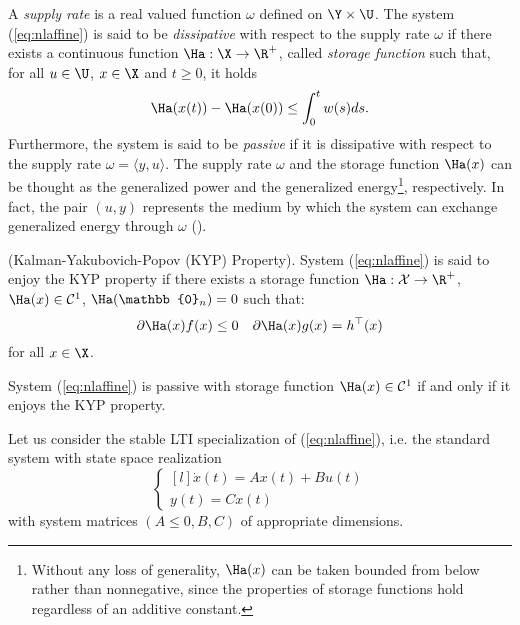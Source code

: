 A \textit{supply rate} is a real valued function $\omega$ defined on $\Y\times\U$. The  system (\ref{eq:nlaffine}) is said to be \textit{dissipative} with respect to the supply rate $\omega$ if there exists a continuous function $\Ha:\X\rightarrow\R^+$, called \textit{storage function} such that, for all $u\in\U$, $x\in\X$ and $t\geq 0$, it holds
%
\begin{equation*}
    \Ha(x(t))-\Ha(x(0)) \leq \int_0^tw(s)ds.
\end{equation*}
%
Furthermore, the system is said to be \textit{passive} if it is dissipative with respect to the supply rate $\omega = \langle y,u \rangle$. The supply rate $\omega$ and the storage function $\Ha(x)$ can be thought as the generalized power and the generalized energy\footnote{Without any loss of generality, $\Ha(x)$ can be taken bounded from below rather than nonnegative, since the properties of storage functions hold regardless of an additive constant.}, respectively. In fact, the pair $(u,y)$ represents the medium by which the system can exchange generalized energy through $\omega$ (\cite{secchi2007control}).
%
%
\begin{defn}(Kalman-Yakubovich-Popov (KYP) Property).
%
System (\ref{eq:nlaffine}) is said to enjoy the KYP property if there exists a storage function $\Ha:\mathcal{X}\rightarrow\R^+$, $\Ha(x)\in\mathcal{C}^1$, $\Ha(\mathbb{0}_n) = 0$ such that:
\begin{equation*}
        {\partial\Ha(x)}f(x)\leq 0\quad {\partial\Ha(x)}g(x)= h^\top(x)
\end{equation*}
%
for all $x\in\X$.
%
\end{defn}
%
\begin{prop}
%
System (\ref{eq:nlaffine}) is passive with storage function $\Ha(x)\in \mathcal{C}^1$ if and only if it enjoys the KYP property.
%
\end{prop}
%
Let us consider the stable LTI specialization of (\ref{eq:nlaffine}), i.e. the standard system with state space realization
%
\begin{equation}\label{eq:lsys}
\left\{
\begin{matrix*}[l]
\dot{x}(t) = Ax(t) + Bu(t)\\
y(t) = Cx(t)
\end{matrix*}
\right.
\end{equation}
with system matrices $(A\leq 0,B,C)$ of appropriate dimensions.
